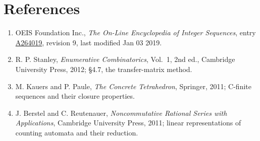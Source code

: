 \documentclass[11pt]{article}
\theoremstyle{definition}
\begin{document}
\section{References}

\begin{enumerate}

\item OEIS Foundation Inc., \emph{The On-Line Encyclopedia of Integer Sequences}, entry \href{https://oeis.org/A264019}{A264019}, revision 9, last modified Jan 03 2019.

\item R. P. Stanley, \emph{Enumerative Combinatorics}, Vol.~1, 2nd ed., Cambridge University Press, 2012; \S4.7, the transfer-matrix method.

\item M. Kauers and P. Paule, \emph{The Concrete Tetrahedron}, Springer, 2011; C-finite sequences and their closure properties.

\item J. Berstel and C. Reutenauer, \emph{Noncommutative Rational Series with Applications}, Cambridge University Press, 2011; linear representations of counting automata and their reduction.

\end{enumerate}
\end{document}
